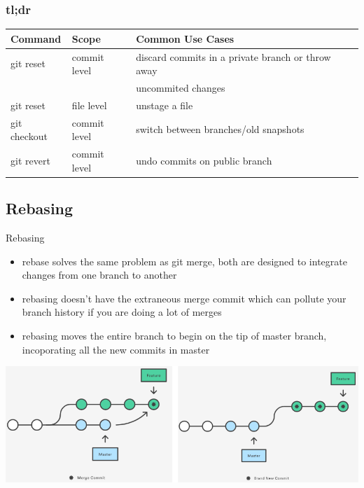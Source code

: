 \documentclass[12pt]{beamer}
\begin{document}
\begin{frame}
\frametitle{tl;dr}
\begin{table}[]
	\footnotesize
	\begin{tabular}{l|l|l}
		Command      & Scope        & Common Use Cases                                                     \\
		\hline
		git reset    & commit level & discard commits in a private branch or throw away \\
					 &				& uncommited changes \\
		git reset    & file level   & unstage a file                                                       \\
		git checkout & commit level & switch between branches/old snapshots                                \\
		git revert   & commit level & undo commits on public branch                                       
	\end{tabular}
\end{table}
\end{frame}

\subsection{Rebasing}
\begin{frame}{Rebasing}
\begin{itemize}
	\item rebase solves the same problem as git merge, both are designed to integrate changes from one branch to another
	\item rebasing doesn't have the extraneous merge commit which can pollute your branch history if you are doing a lot of merges
	\item rebasing moves the entire branch to begin on the tip of master branch, incoporating all the new commits in master
\end{itemize}
\begin{center}
	\includegraphics[width=\linewidth]{merge_vs_rebase}
\end{center}
\end{frame}
\end{document}
